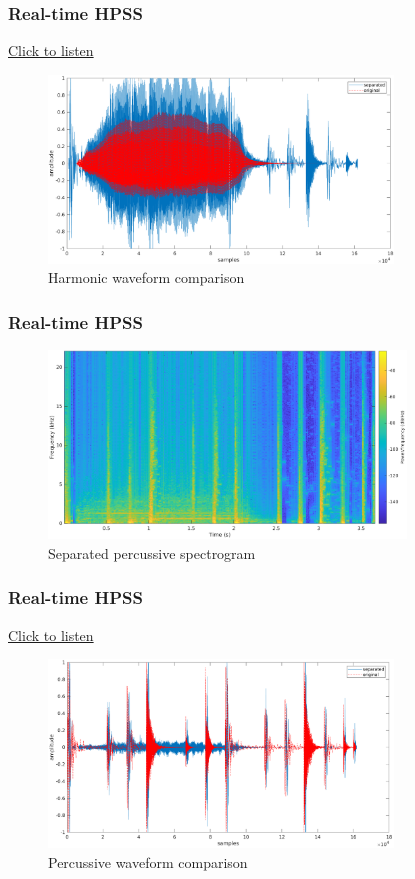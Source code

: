 \documentclass{beamer}
\begin{document}
\begin{frame}
	\frametitle{Real-time HPSS}
	\href{run:../audio/harm_rt.wav}{Click to listen}\\
	\begin{figure}
	\includegraphics[height=5cm]{../images/harm_realtime_cmp.png}
		\caption{Harmonic waveform comparison}
	\end{figure}
\end{frame}

\begin{frame}
	\frametitle{Real-time HPSS}
	\begin{figure}
	\includegraphics[height=5cm]{../images/perc_realtime.png}
		\caption{Separated percussive spectrogram}
	\end{figure}
\end{frame}

\begin{frame}
	\frametitle{Real-time HPSS}
	\href{run:../audio/perc_rt.wav}{Click to listen}\\
	\begin{figure}
	\includegraphics[height=5cm]{../images/perc_realtime_cmp.png}
		\caption{Percussive waveform comparison}
	\end{figure}
\end{frame}
\end{document}
